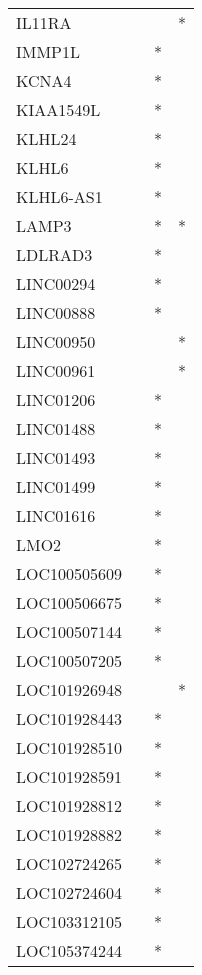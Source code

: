 \begin{longtable}{lccc}
IL11RA        &       &    &       * \\
IMMP1L        &       &  * &         \\
KCNA4         &       &  * &         \\
KIAA1549L     &       &  * &         \\
KLHL24        &       &  * &         \\
KLHL6         &       &  * &         \\
KLHL6-AS1     &       &  * &         \\
LAMP3         &       &  * &       * \\
LDLRAD3       &       &  * &         \\
LINC00294     &       &  * &         \\
LINC00888     &       &  * &         \\
LINC00950     &       &    &       * \\
LINC00961     &       &    &       * \\
LINC01206     &       &  * &         \\
LINC01488     &       &  * &         \\
LINC01493     &       &  * &         \\
LINC01499     &       &  * &         \\
LINC01616     &       &  * &         \\
LMO2          &       &  * &         \\
LOC100505609  &       &  * &         \\
LOC100506675  &       &  * &         \\
LOC100507144  &       &  * &         \\
LOC100507205  &       &  * &         \\
LOC101926948  &       &    &       * \\
LOC101928443  &       &  * &         \\
LOC101928510  &       &  * &         \\
LOC101928591  &       &  * &         \\
LOC101928812  &       &  * &         \\
LOC101928882  &       &  * &         \\
LOC102724265  &       &  * &         \\
LOC102724604  &       &  * &         \\
LOC103312105  &       &  * &         \\
LOC105374244  &       &  * &         \\

\end{longtable}
